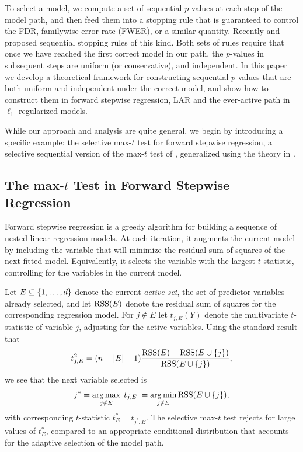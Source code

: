 \documentclass{article}
\begin{document}
To select a model, we compute a set of sequential $p$-values at each step of the model path, and then feed them into a stopping rule that is guaranteed to control the FDR, familywise error rate (FWER), or a similar quantity. Recently \citet{gsell2013sequential} and \citet{li2015accumulation} proposed sequential stopping rules of this kind. 
Both sets of rules require that once we have reached the first correct model in our path, the $p$-values in subsequent steps are uniform (or conservative),
and independent. In this paper we develop a theoretical framework for constructing sequential $p$-values that are both uniform and independent under the correct model, and show how to construct them in forward stepwise regression, LAR and the ever-active path in $\ell_1$-regularized models. 

While our approach and analysis are quite general, we begin by introducing a specific example: the selective max-$t$ test for forward stepwise regression, a selective sequential version of the max-$t$ test of \citet{buja2014}, generalized using the theory in \citet{fithian2014optimal}.

\subsection{The max-$t$ Test in Forward Stepwise Regression}

Forward stepwise regression is a greedy algorithm for building a sequence of nested linear regression models. At each iteration, it augments the current model by including the variable that will minimize the residual sum of squares of the next fitted model. Equivalently, it selects the variable with the largest $t$-statistic, controlling for the variables in the current model.

Let $E \subseteq \{1, \ldots, d\}$ denote the current {\em active set}, the set of predictor variables already selected, and let $\text{RSS}(E)$ denote the residual sum of squares for the corresponding regression model. For $j\notin E$ let $t_{j,E}(Y)$ denote the multivariate $t$-statistic of variable $j$, adjusting for the active variables. Using the standard result that
\begin{equation}
t_{j,E}^2 = (n-|E|-1) \frac{\text{RSS}(E) - \text{RSS}(E \cup \{j\})}{\text{RSS}(E \cup \{j\})},
\end{equation}
we see that the next variable selected is 
\begin{equation}
j^* = \operatorname*{arg\,max}_{j\notin E} |t_{j,E}| = \operatorname*{arg\,min}_{j\notin E} \text{RSS}(E \cup \{j\}),
\end{equation}
with corresponding $t$-statistic $t_E^* = t_{j^*,E}$. The selective max-$t$ test rejects for large values of $t_E^*$, compared to an appropriate conditional distribution that accounts for the adaptive selection of the model path.
\end{document}

